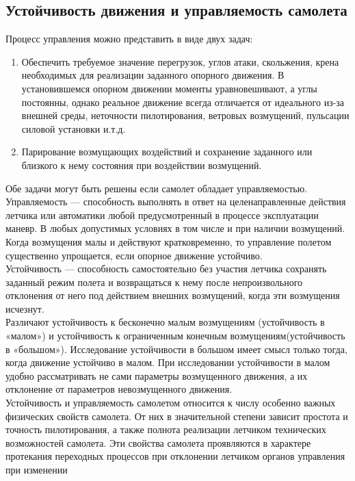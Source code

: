 \documentclass{article}
\begin{document}
\subsection{Устойчивость движения и управляемость самолета}
Процесс управления можно представить в виде двух задач:
\begin{enumerate}
    \item Обеспечить требуемое значение перегрузок, углов атаки, скольжения,
        крена необходимых для реализации заданного опорного движения. В
        установившемся опорном движении моменты уравновешивают, а углы
        постоянны, однако реальное движение всегда отличается от идеального
        из-за внешней среды, неточности пилотирования, ветровых возмущений,
        пульсации силовой установки и.т.д.

    \item Парирование возмущающих воздействий и сохранение заданного или
        близкого к нему состояния при воздействии возмущений.
\end{enumerate}
Обе задачи могут быть решены если самолет обладает управляемостью. \\
Управляемость --- способность выполнять в ответ на целенаправленные действия
летчика или автоматики любой предусмотренный в процессе эксплуатации маневр. В
любых допустимых условиях в том числе и при наличии возмущений. Когда
возмущения малы и действуют кратковременно, то управление полетом существенно
упрощается, если опорное движение устойчиво.\\
Устойчивость --- способность самостоятельно без участия летчика сохранять
заданный режим полета и возвращаться к нему после непроизвольного отклонения от
него под действием внешних возмущений, когда эти возмущения исчезнут.\\
Различают устойчивость к бесконечно малым возмущениям (устойчивость в «малом»)
и устойчивость к ограниченным конечным возмущениям(устойчивость в «большом»).
Исследование устойчивости в большом имеет смысл только тогда, когда движение
устойчиво в малом. При исследовании устойчивости в малом удобно рассматривать
не сами параметры возмущенного движения, а их отклонение от параметров
невозмущенного движения.\\
Устойчивость и управляемость самолетом относится к числу особенно важных
физических свойств самолета. От них в значительной степени зависит простота и
точность пилотирования, а также полнота реализации летчиком технических
возможностей самолета. Эти свойства самолета проявляются в характере протекания
переходных процессов при отклонении летчиком органов управления при изменении
\end{document}
